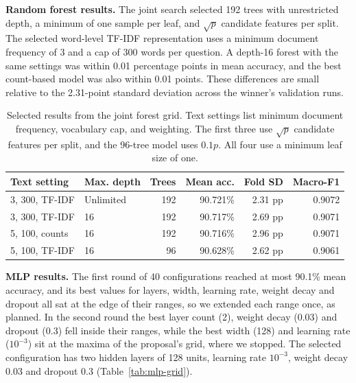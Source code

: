 \documentclass[12pt]{article}
\begin{document}
\textbf{Random forest results.} The joint search selected 192 trees with unrestricted
depth, a minimum of one sample per leaf, and $\sqrt p$ candidate features per split. The
selected word-level TF-IDF representation uses a minimum document frequency of 3 and a cap
of 300 words per question. A depth-16 forest with the same settings was within 0.01 percentage
points in mean accuracy, and the best count-based model was also within 0.01 points. These
differences are small relative to the 2.31-point standard deviation across the winner's
validation runs.

\begin{table}[ht]
\centering
\small
\begin{tabularx}{\linewidth}{@{}Ylrrrr@{}}
\toprule
Text setting & Max. depth & Trees & Mean acc. & Fold SD & Macro-F1 \\
, 300, TF-IDF & Unlimited & 192 & 90.721\% & 2.31 pp & 0.9072 \\
3, 300, TF-IDF & 16 & 192 & 90.717\% & 2.69 pp & 0.9071 \\
5, 100, counts & 16 & 192 & 90.716\% & 2.96 pp & 0.9071 \\
5, 100, TF-IDF & 16 & 96 & 90.628\% & 2.62 pp & 0.9061 \\
\bottomrule
\end{tabularx}
\caption{Selected results from the joint forest grid. Text settings list minimum document
frequency, vocabulary cap, and weighting. The first three use $\sqrt p$ candidate features
per split, and the 96-tree model uses $0.1p$. All four use a minimum leaf size of one.}
\label{tab:forest-review}
\end{table}

\textbf{MLP results.} The first round of 40 configurations reached at most 90.1\% mean accuracy,
and its best values for layers, width, learning rate, weight decay and dropout all sat at the edge of
their ranges, so we extended each range once, as planned. In the second round the best layer count (2),
weight decay (0.03) and dropout (0.3) fell inside their ranges, while the best width (128) and learning
rate ($10^{-3}$) sit at the maxima of the proposal's grid, where we stopped. The selected configuration
has two hidden layers of 128 units, learning rate $10^{-3}$, weight decay 0.03 and dropout 0.3
(Table~\ref{tab:mlp-grid}).
\end{document}

